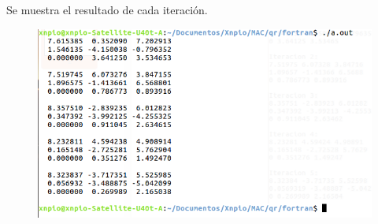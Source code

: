 \documentclass[a4paper,12pt]{article}
\begin{document}
Se muestra el resultado de cada iteración.

\begin{figure} [h]
 \centering
 \includegraphics[scale=0.5]{1.png}
\end{figure}

 
\end{document}
